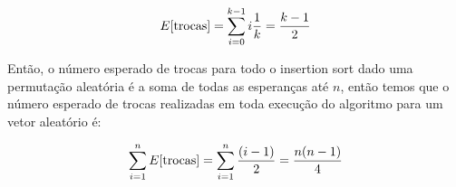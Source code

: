 \documentclass{article}
\begin{document}
\begin{equation}
	\notag
	E[\text{trocas}] = \sum\limits_{i=0}^{k-1} i \dfrac{1}{k} = \dfrac{k-1}{2}
\end{equation}

Então, o número esperado de trocas para todo o insertion sort dado uma permutação
aleatória é a soma de todas as esperanças até $n$, então temos que o número esperado
de trocas realizadas em toda execução do algoritmo para um vetor aleatório é:

\begin{equation}
\notag
	\sum\limits_{i=1}^{n}E[\text{trocas}] = \sum\limits_{i=1}^{n} \dfrac{(i-1)}{2} =\dfrac{n(n-1)}{4}
\end{equation}
\end{document}
